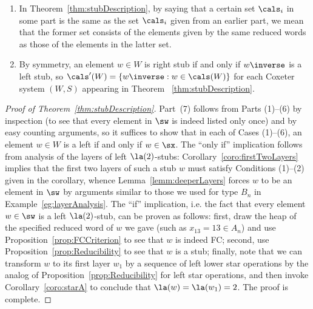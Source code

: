 \begin{remark}
    \label{rmk:stubRemarks1}
    \begin{enumerate}
        \item In Theorem~\ref{thm:stubDescription}, by saying that a certain set $\cals_i$ in some part  is the same as
             the set $\cals_i$ given from an earlier part, we mean that the former set consists of the elements
             given by the same reduced words as those of the elements in the latter set. 
        \item By symmetry, an element $w\in W$ is right stub if and only if $w\inverse$ is a left stub, so
             $\cals'(W)=\{w\inverse: w\in \cals(W)\}$ for each Coxeter system $(W,S)$ appearing in Theorem
            ~\ref{thm:stubDescription}.
    \end{enumerate} 
\end{remark}


\begin{proof}[Proof of Theorem~\ref{thm:stubDescription}]
    Part~(7) follows from Parts (1)--(6) by inspection (to see that every element in $\sw$ is indeed
    listed only once) and by easy counting arguments, so it suffices to show that in each of Cases
    (1)--(6), an element $w\in W$ is a left \twostub if and only if $w\in \sx$. The ``only if''
    implication follows from analysis of the layers of left $\la(2)$-stubs:
    Corollary~\ref{coro:firstTwoLayers} implies that the first two layers of such a stub $w$ must satisfy
    Conditions (1)--(2) given in the corollary, whence Lemma~\ref{lemm:deeperLayers} forces $w$ to be an
    element in $\sw$ by arguments similar to those we used for type $B_n$ in
    Example~\ref{eg:layerAnalysis}. The ``if'' implication, i.e. the fact that every element $w\in \sw$ is
    a left $\la(2)$-stub, can be proven as follows: first, draw the heap of the specified reduced
    word of $w$ we gave (such as $x_{13}=13\in A_n$) and use Proposition~\ref{prop:FCCriterion} to see that $w$
    is indeed FC; second, use Proposition~\ref{prop:Reducibility} to see that $w$ is a stub;
    finally, note that we can transform $w$ to its first layer $w_1$ by a sequence of left lower
    star operations by the analog of Proposition~\ref{prop:Reducibility} for left star operations,
    and then invoke Corollary~\ref{coro:starA} to conclude that $\la(w)=\la(w_1)=2$.  The proof is complete.
\end{proof}

